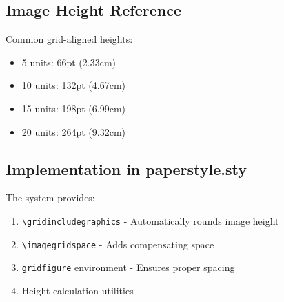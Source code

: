 \documentclass[11pt]{article}
\begin{document}
\subsection{Image Height Reference}

Common grid-aligned heights:
\begin{itemize}
\item 5 units: 66pt (2.33cm)
\item 10 units: 132pt (4.67cm) 
\item 15 units: 198pt (6.99cm)
\item 20 units: 264pt (9.32cm)
\end{itemize}

\subsection{Implementation in paperstyle.sty}

The system provides:
\begin{enumerate}
\item \texttt{\textbackslash gridincludegraphics} - Automatically rounds image height
\item \texttt{\textbackslash imagegridspace} - Adds compensating space
\item \texttt{gridfigure} environment - Ensures proper spacing
\item Height calculation utilities
\end{enumerate}
\end{document}
